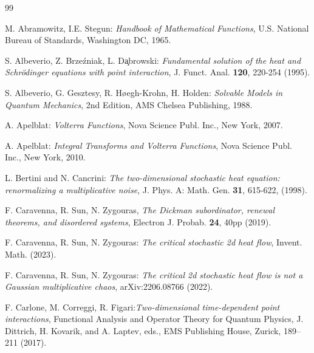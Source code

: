 \documentclass[10pt]{article}
\numberwithin{equation}{section}
\theoremstyle{definition}
\begin{document}
\begin{thebibliography}{99}


 M. Abramowitz, I.E. Stegun: \emph{Handbook of Mathematical Functions}, U.S. National Bureau of Standards,  Washington DC, 1965.


 S. Albeverio, Z. Brze\'zniak, L. D\c{a}browski: \emph{Fundamental solution of the heat and Schr\"odinger equations with point interaction}, J. Funct. Anal. \textbf{120}, 220-254 (1995).


 S. Albeverio, G. Gesztesy, R. H{\o}egh-Krohn, H. Holden: \emph{Solvable Models in Quantum Mechanics}, 2nd Edition, AMS Chelsea Publishing, 1988.



  A. Apelblat: \emph{Volterra Functions}, Nova Science Publ. Inc., New York, 2007.


  A. Apelblat: \emph{Integral Transforms and Volterra Functions}, Nova Science Publ. Inc., New York, 2010.




 L. Bertini and N. Cancrini: \emph{The two-dimensional stochastic heat equation: renormalizing a multiplicative
noise}, J. Phys. A: Math. Gen. \textbf{31}, 615-622, (1998).




 F. Caravenna, R. Sun, N. Zygouras, \emph{The Dickman subordinator, renewal theorems, and disordered
systems},  Electron J. Probab. \textbf{24}, 40pp (2019).







  F. Caravenna, R. Sun, N. Zygouras: \emph{The critical stochastic 2d heat flow}, Invent. Math.  (2023).


  F. Caravenna, R. Sun, N. Zygouras: \emph{The critical  2d stochastic heat flow is not a Gaussian multiplicative chaos}, 	\textup{arXiv:2206.08766} (2022).

  F. Carlone, M. Correggi, R. Figari:\emph{Two-dimensional time-dependent point interactions}, Functional Analysis and Operator Theory for Quantum Physics, J. Dittrich, H. Kovarik, and A. Laptev, eds., EMS Publishing House, Zurick, 189--211 (2017).



\end{thebibliography}
\end{document}
